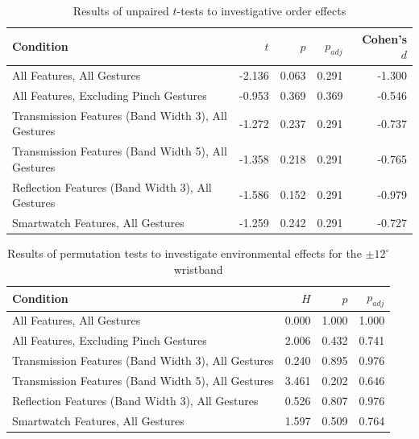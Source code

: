 \documentclass[ oneside,%
                    author={Jack Jarvis},
                    degree={BSc},
                     title={FlexIR: Flexible PCB Wristbands for Infrared Based Gesture Recognition},
                    unit={COMS30045},
                    subtitle={Investigating the Effect of LED Viewing Angle on Gesture Classification in Infrared Sensing Systems}]{dissertation}
\begin{document}
\begin{table}[htp]
    \centering
    \begin{tabular}{lrrrr}
        \toprule
        Condition & $t$ & $p$ & $p_{adj}$ & Cohen's $d$ \\
        \midrule
        All Features, All Gestures & -2.136 & 0.063 & 0.291 & -1.300 \\
        All Features, Excluding Pinch Gestures & -0.953 & 0.369 & 0.369 & -0.546 \\
        Transmission Features (Band Width 3), All Gestures & -1.272 & 0.237 & 0.291 & -0.737 \\
        Transmission Features (Band Width 5), All Gestures & -1.358 & 0.218 & 0.291 & -0.765 \\
        Reflection Features (Band Width 3), All Gestures & -1.586 & 0.152 & 0.291 & -0.979 \\
        Smartwatch Features, All Gestures & -1.259 & 0.242 & 0.291 & -0.727 \\
        \bottomrule
    \end{tabular}
    \caption{Results of unpaired $t$-tests to investigative order effects}
    \label{tab:order_effects}
\end{table}

\begin{table}[htp]
    \centering
    \begin{tabular}{lrrr}
        \toprule
        Condition & $H$ & $p$ & $p_{adj}$ \\
        \midrule
        All Features, All Gestures & 0.000 & 1.000 & 1.000 \\
        All Features, Excluding Pinch Gestures & 2.006 & 0.432 & 0.741 \\
        Transmission Features (Band Width 3), All Gestures & 0.240 & 0.895 & 0.976 \\
        Transmission Features (Band Width 5), All Gestures & 3.461 & 0.202 & 0.646 \\
        Reflection Features (Band Width 3), All Gestures & 0.526 & 0.807 & 0.976 \\
        Smartwatch Features, All Gestures & 1.597 & 0.509 & 0.764 \\
        \bottomrule
    \end{tabular}
    \caption{Results of permutation tests to investigate environmental effects for the $\pm 12^\circ$ wristband}
    \label{tab:location_effects_12}
\end{table}
\end{document}
